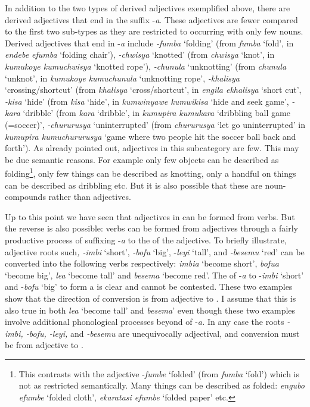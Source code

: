 \documentclass[output=paper,
modfonts
]{langscibook}
\begin{document}
In addition to the two types of derived adjectives exemplified above, there are derived adjectives that end in the suffix -\textit{a}. These adjectives are fewer compared to the first two sub-types as they are restricted to occurring with only few nouns. Derived adjectives that end in -\textit{a} include \textit{-fumba} ‘folding’ (from \textit{fumba} ‘fold’, in \textit{endebe efumba} ‘folding chair’), \textit{-chwisya} ‘knotted’ (from \textit{chwisya} ‘knot’, in \textit{kumukoye kumuchwisya} ‘knotted rope’), \textit{-chunula} ‘unknotting’ (from \textit{chunula} ‘unknot’, in \textit{kumukoye kumuchunula} ‘unknotting rope’, \textit{-khalisya} ‘crossing/shortcut’ (from \textit{khalisya} ‘cross/shortcut’, in \textit{engila ekhalisya} ‘short cut’, \textit{-kisa} ‘hide’ (from \textit{kisa} ‘hide’, in \textit{kumwinyawe kumwikisa} ‘hide and seek game’, \textit{-kara} ‘dribble’ (from \textit{kara} ‘dribble’, in \textit{kumupira kumukara} ‘dribbling ball game (=soccer)’, \textit{-chururusya} ‘uninterrupted’ (from \textit{chururusya} ‘let go uninterrupted’ in \textit{kumupira kumuchururusya} ‘game where two people hit the soccer ball back and forth’). As already pointed out, adjectives in this subcategory are few. This may be due semantic reasons. For example only few objects can be described as folding\footnote{This contrasts with the adjective -\textit{fumbe} ‘folded’ (from \textit{fumba} ‘fold’) which is not as restricted semantically. Many things can be described as folded: \textit{engubo efumbe} ‘folded cloth’, \textit{ekaratasi efumbe} ‘folded paper’ etc. }, only few things can be described as knotting, only a handful on things can be described as dribbling etc. But it is also possible that these are noun- compounds rather than adjectives. 

Up to this point we have seen that adjectives in  can be formed from verbs. But the reverse is also possible: verbs can be formed from adjectives through a fairly productive process of suffixing -\textit{a} to the  of the adjective. To briefly illustrate, adjective roots such\textit{, -imbi} ‘short’, \textit{-bofu} ‘big’, -\textit{leyi} ‘tall’, and\textit{ -besemu} ‘red’ can be converted into the following verbs respectively: \textit{imbia} ‘become short’, \textit{bofua} ‘become big’,\textit{ lea} ‘become tall’ and\textit{ besema} ‘become red’. The  of -\textit{a} to -\textit{imbi }‘short’ and -\textit{bofu} ‘big’ to form a  is clear and cannot be contested. These two examples show that the direction of conversion is from adjective to . I assume that this is also true in both \textit{lea} ‘become tall’ and \textit{besema}’ even though these two examples involve additional phonological processes beyond  of -\textit{a.} In any case the roots \textit{-imbi, -bofu, -leyi, }and\textit{ -besemu} are unequivocally adjectival, and conversion must be from adjective to .  
\end{document}

